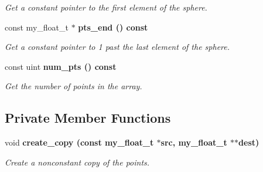 \begin{CompactItemize}
\begin{CompactList}\small\item\em Get a constant pointer to the first element of the sphere. \item\end{CompactList}\item 
const my\_\-float\_\-t $\ast$ \bf{pts\_\-end} () const \label{classASCbase_1_1DiscreteSphere_19c0f6e97d7235647271a5376dec43c6}

\begin{CompactList}\small\item\em Get a constant pointer to 1 past the last element of the sphere. \item\end{CompactList}\item 
const uint \bf{num\_\-pts} () const \label{classASCbase_1_1DiscreteSphere_f3062c3c256ce124eae95a440cd385d0}

\begin{CompactList}\small\item\em Get the number of points in the array. \item\end{CompactList}\end{CompactItemize}
\subsection*{Private Member Functions}
\begin{CompactItemize}
\item 
void \bf{create\_\-copy} (const my\_\-float\_\-t $\ast$src, my\_\-float\_\-t $\ast$$\ast$dest)\label{classASCbase_1_1DiscreteSphere_27a44b0af870362405f7ff812e909e02}

\begin{CompactList}\small\item\em Create a nonconstant copy of the points. \item\end{CompactList}\end{CompactItemize}
